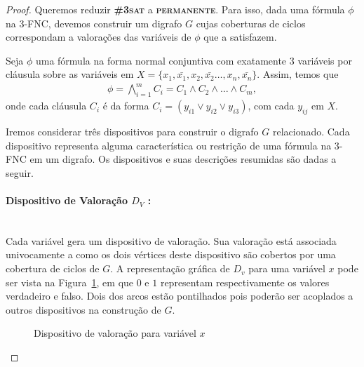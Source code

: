 \documentclass[paper=a4, fontsize=11pt]{scrartcl} %
\numberwithin{figure}{section} %
\newcommand{\prob}[1]{\textsc{\textbf{#1}}}
\begin{document}
\begin{proof}

Queremos reduzir \prob{\#3sat} a \prob{permanente}. Para isso, dada uma fórmula $\phi$ na 3-FNC, devemos construir um digrafo $ G $ cujas coberturas de ciclos correspondam a valorações das variáveis de $\phi$ que a satisfazem.

Seja $\phi$ uma fórmula na forma normal conjuntiva com exatamente 3 variáveis por cláusula sobre as variáveis em $ X = \{x_1, \bar{x_1}, x_2, \bar{x_2} \dots, x_n, \bar{x_n} \} $. Assim, temos que
\begin{align*}
\phi = \bigwedge\limits_{i = 1}^{m}C_i = C_1 \land C_2 \land \dots \land C_m,
\end{align*}
onde cada cláusula $C_i$ é da forma $C_i = (y_{i1} \lor y_{i2} \lor y_{i3} )$, com cada $y_{ij}$ em $X$.

Iremos considerar três dispositivos para construir o digrafo $ G $ relacionado. Cada dispositivo representa alguma característica ou restrição de uma fórmula na 3-FNC em um digrafo. Os dispositivos e suas descrições resumidas são dadas a seguir.

\paragraph{Dispositivo de Valoração $D_V$ :} \hfill \\

      Cada variável gera um dispositivo de valoração. Sua valoração está associada univocamente a como os dois vértices deste dispositivo são cobertos por uma cobertura de ciclos de $G$. A representação gráfica de $D_v$ para uma variável $x$ pode ser vista na Figura~\ref{fig:Dv}, em que $0$ e $1$ representam respectivamente os valores verdadeiro e falso. Dois dos arcos estão pontilhados pois poderão ser acoplados a outros dispositivos na construção de $G$.
      
\FloatBarrier
\begin{figure}
\centering
{}
\caption{Dispositivo de valoração para variável $x$}
\label{fig:Dv}
\end{figure}


\end{proof}
\end{document}

